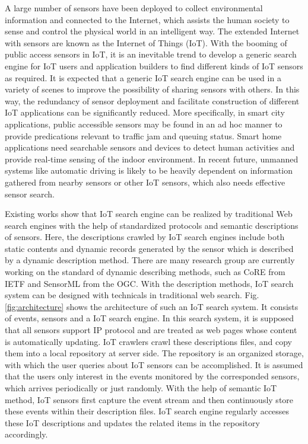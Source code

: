 \documentclass[conference]{IEEEtran}
\begin{document}
A large number of sensors have been deployed to collect environmental information and connected to the Internet, which assists the human society to sense and control the physical world in an intelligent way. 
The extended Internet with sensors are known as the Internet of Things (IoT). 
With the booming of public access sensors in IoT, it is an inevitable trend to develop a generic search engine for IoT users and application builders to find different kinds of IoT sensors as required. 
It is expected that a generic IoT search engine can be used in a variety of scenes to improve the possibility of sharing sensors with others.
In this way, the redundancy of sensor deployment and facilitate construction of different IoT applications can be significantly reduced.
More specifically, in smart city applications, public accessible sensors may be found in an ad hoc manner to provide predications relevant to traffic jam and queuing status. 
Smart home applications need searchable sensors and devices to detect human activities and provide real-time sensing of the indoor environment. 
In recent future, unmanned systems like automatic driving is likely to be heavily dependent on information gathered from nearby sensors or other IoT sensors, which also needs effective sensor search. 

Existing works show that IoT search engine can be realized by traditional Web search engines with the help of standardized protocols and semantic descriptions of sensors\cite{Pfisterer2011}. 
Here, the descriptions crawled by IoT search engines include both static contents and dynamic records generated by the sensor which is described by a dynamic description method.
There are many research group are currently working on the standard of dynamic describing methods, such as CoRE\cite{CoREWorkingGroup2012} from IETF and SensorML\cite{botts2007opengis} from the OGC. 
With the description methods, IoT search system can be designed with technicals in traditional web search.
Fig.\ref{fig:architecture} shows the architecture of such an IoT search system.
It consists of events, sensors and a IoT search engine.
In this search system, it is supposed that all sensors support IP protocol and are treated as web pages whose content is automatically updating.
IoT crawlers crawl these descriptions files, and copy them into a local repository at server side. 
The repository is an organized storage, with which the user queries about IoT sensors can be accomplished.
It is assumed that the users only interest in the events monitored by the corresponded sensors, which arrives periodically or just randomly. 
With the help of semantic IoT method, IoT sensors first capture the event stream and then continuously store these events within their description files. 
IoT search engine regularly accesses these IoT descriptions and updates the related items in the repository accordingly. 
\end{document}
